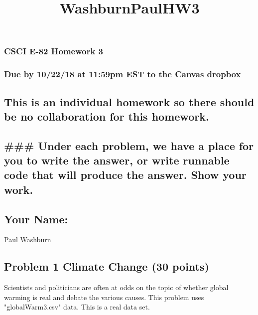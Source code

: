 \documentclass[11pt]{article}
\title{WashburnPaulHW3}
\begin{document}
    
    
    \maketitle
    
    

    
    \subsubsection{CSCI E-82 Homework 3}\label{csci-e-82-homework-3}

\subsubsection{Due by 10/22/18 at 11:59pm EST to the Canvas
dropbox}\label{due-by-102218-at-1159pm-est-to-the-canvas-dropbox}

\subsection{This is an individual homework so there should be no
collaboration for this
homework.}\label{this-is-an-individual-homework-so-there-should-be-no-collaboration-for-this-homework.}

\subsection{\#\#\# Under each problem, we have a place for you to write
the answer, or write runnable code that will produce the answer. Show
your
work.}\label{under-each-problem-we-have-a-place-for-you-to-write-the-answer-or-write-runnable-code-that-will-produce-the-answer.-show-your-work.}

    \subsection{Your Name:}\label{your-name}

    Paul Washburn

    \subsection{Problem 1 Climate Change (30
points)}\label{problem-1-climate-change-30-points}

Scientists and politicians are often at odds on the topic of whether
global warming is real and debate the various causes. This problem uses
"globalWarm3.csv" data. This is a real data set.
\end{document}
